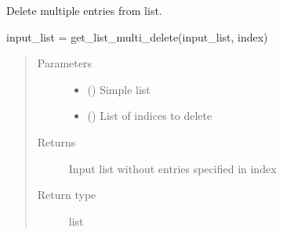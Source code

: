 \documentclass[letterpaper,10pt,english,openany,oneside]{sphinxmanual}
\begin{document}
\begin{fulllineitems}
\label{\detokenize{pygpc:pygpc.misc.get_list_multi_delete}}
Delete multiple entries from list.

input\_list = get\_list\_multi\_delete(input\_list, index)
\begin{quote}\begin{description}
\item[{Parameters}] \leavevmode\begin{itemize}
\item {} 
 () \textendash{} Simple list

\item {} 
 () \textendash{} List of indices to delete

\end{itemize}

\item[{Returns}] \leavevmode
{} \textendash{} Input list without entries specified in index

\item[{Return type}] \leavevmode
list

\end{description}\end{quote}

\end{fulllineitems}

\end{document}
